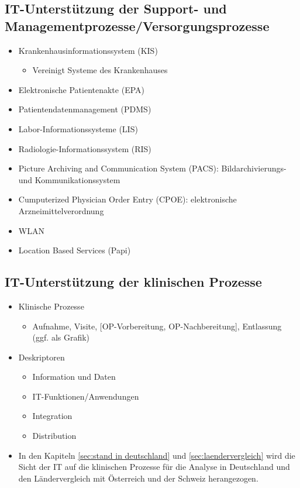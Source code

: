 	\subsection{IT-Unterstützung der Support- und Managementprozesse/Versorgungsprozesse}
	\parencite{oswald2019} \parencite[14]{braeutigam2017}
	\begin{itemize}
		\item Krankenhausinformationssystem (KIS)
		\begin{itemize}
			\item Vereinigt Systeme des Krankenhauses
		\end{itemize}
		\item Elektronische Patientenakte (EPA)
		\item Patientendatenmanagement (PDMS)
		\item Labor-Informationssysteme (LIS)
		\item Radiologie-Informationssystem (RIS)
		\item Picture Archiving and Communication System (PACS): Bildarchivierungs- und Kommunikationssystem
		\item Cumputerized Physician Order Entry (CPOE): elektronische Arzneimittelverordnung
		\item WLAN
		\item Location Based Services (Papi)
	\end{itemize}
	\subsection{IT-Unterstützung der klinischen Prozesse}
		\begin{itemize}
			\item Klinische Prozesse
			\begin{itemize}
				\item Aufnahme, Visite, [OP-Vorbereitung, OP-Nachbereitung], Entlassung (ggf. als Grafik) \parencite[37]{huebner2019}
			\end{itemize}
			\item Deskriptoren
		\begin{itemize} 
			\item Information und Daten
			\item IT-Funktionen/Anwendungen
			\item Integration
			\item Distribution
		\end{itemize}
		\item In den Kapiteln \ref{sec:stand in deutschland} und \ref{sec:laendervergleich} wird die Sicht der IT auf die klinischen Prozesse für die Analyse in Deutschland und den Ländervergleich mit Österreich und der Schweiz herangezogen.
		\end{itemize}
